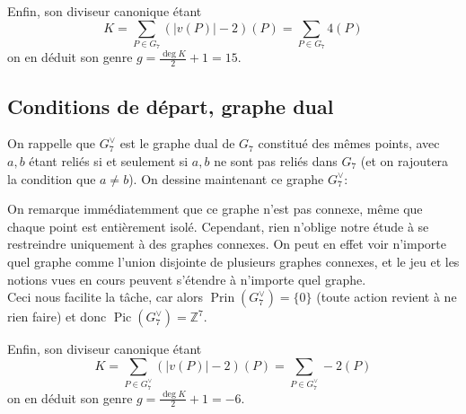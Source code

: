\documentclass{article}
\newcommand{\Prin}{\operatorname{Prin}}
\newcommand{\Pic}{\operatorname{Pic}}
\newcommand{\deg}{\operatorname{deg}}
\begin{document}
Enfin, son diviseur canonique étant \[K = \sum_{P\in G_7}(|v(P)|-2)(P) = \sum_{P\in G_7}4(P)\]
on en déduit son genre $\displaystyle g = \frac{\deg K}{2}+1 = 15$.\\

\subsection{Conditions de départ, graphe dual}

On rappelle que $G_7^\vee$ est le graphe dual de $G_7$ constitué des mêmes points, avec $a,b$ étant reliés si et seulement si $a,b$ ne sont pas reliés dans $G_7$ (et on rajoutera la condition que $a\neq b$). On dessine maintenant ce graphe $G_7^\vee$:


\begin{center}
\end{center}

On remarque immédiatemment que ce graphe n'est pas connexe, même que chaque point est entièrement isolé. Cependant, rien n'oblige notre étude à se restreindre uniquement à des graphes connexes. On peut en effet voir n'importe quel graphe comme l'union disjointe de plusieurs graphes connexes, et le jeu et les notions vues en cours peuvent s'étendre à n'importe quel graphe.\\
Ceci nous facilite la tâche, car alors $\Prin(G_7^\vee) = \{0\}$ (toute action revient à ne rien faire) et donc $\Pic(G_7^\vee) = \mathbb{Z}^7$.

Enfin, son diviseur canonique étant \[K = \sum_{P\in G_7^\vee}(|v(P)|-2)(P) = \sum_{P\in G_7^\vee}-2(P)\]
on en déduit son genre $\displaystyle g = \frac{\deg K}{2}+1 = -6$.\\
\end{document}
